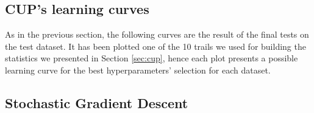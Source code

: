 \begin{appendices}




    \chapter{CUP's learning curves} %
    \label{cha:cup_learning_curves}
        As in the previous section, the following curves are the result of the final tests on the test dataset. It has been plotted one of the 10 trails we used for building the statistics we presented in Section \ref{sec:cup}, hence each plot presents a possible learning curve for the best hyperparameters’ selection for each dataset.
        \section{Stochastic Gradient Descent} %
        \label{sec:cup_sgd}


\end{appendices}

